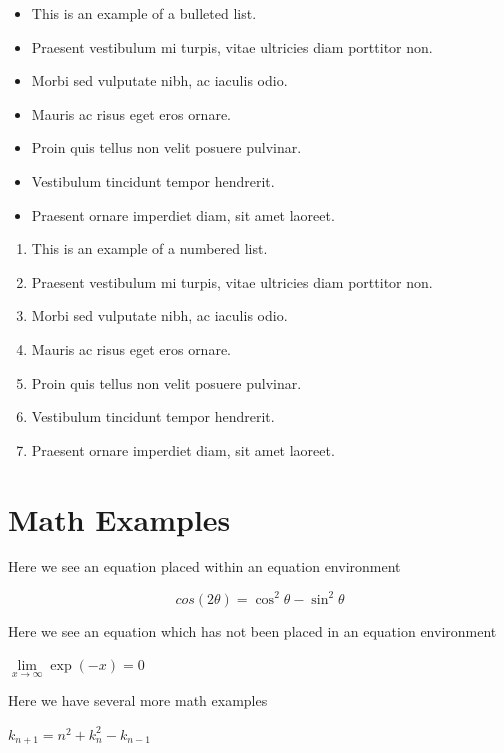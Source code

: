 \begin{itemize}
\item This is an example of a bulleted list.
\item Praesent vestibulum mi turpis, vitae ultricies diam porttitor non.
\item Morbi sed vulputate nibh, ac iaculis odio.
\item Mauris ac risus eget eros ornare.
\item Proin quis tellus non velit posuere pulvinar.
\item Vestibulum tincidunt tempor hendrerit.
\item Praesent ornare imperdiet diam, sit amet laoreet.
\end{itemize}


\begin{enumerate}
\item This is an example of a numbered list.
\item Praesent vestibulum mi turpis, vitae ultricies diam porttitor non.
\item Morbi sed vulputate nibh, ac iaculis odio.
\item Mauris ac risus eget eros ornare.
\item Proin quis tellus non velit posuere pulvinar.
\item Vestibulum tincidunt tempor hendrerit.
\item Praesent ornare imperdiet diam, sit amet laoreet.
\end{enumerate}


\section{Math Examples}



Here we see an equation placed within an equation environment\par
\begin{equation}
cos (2\theta) = {\cos^2}\theta - \sin^2 \theta
\end{equation}

Here we see an equation which has not been placed in an equation environment\par
$
\lim\limits_{x \to \infty} \exp(-x) = 0
$

Here we have several more math examples\par
$
k_{n+1} = n^2 + k_n^2 - k_{n-1}
$

